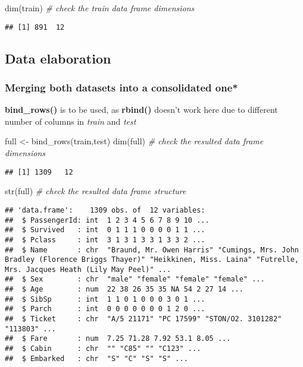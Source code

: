 \documentclass[
]{article}
\newenvironment{Shaded}{\begin{snugshade}}{\end{snugshade}}
\newcommand{\CommentTok}[1]{\textcolor[rgb]{0.56,0.35,0.01}{\textit{#1}}}
\newcommand{\FunctionTok}[1]{\textcolor[rgb]{0.00,0.00,0.00}{#1}}
\newcommand{\NormalTok}[1]{#1}
\newcommand{\OtherTok}[1]{\textcolor[rgb]{0.56,0.35,0.01}{#1}}
\begin{document}
\begin{Shaded}
\begin{Highlighting}[]
\FunctionTok{dim}\NormalTok{(train)  }\CommentTok{\# check the train data frame dimensions}
\end{Highlighting}
\end{Shaded}

\begin{verbatim}
## [1] 891  12
\end{verbatim}

\hypertarget{data-elaboration}{%
\subsection{Data elaboration}\label{data-elaboration}}

\hypertarget{merging-both-datasets-into-a-consolidated-one}{%
\subsubsection{Merging both datasets into a consolidated
one*}\label{merging-both-datasets-into-a-consolidated-one}}

\textbf{bind\_rows()} is to be used, as \textbf{rbind()} doesn't work
here due to different number of columns in \emph{train} and \emph{test}

\begin{Shaded}
\begin{Highlighting}[]
\NormalTok{full }\OtherTok{\textless{}{-}} \FunctionTok{bind\_rows}\NormalTok{(train,test) }
\FunctionTok{dim}\NormalTok{(full)  }\CommentTok{\# check the resulted data frame dimensions}
\end{Highlighting}
\end{Shaded}

\begin{verbatim}
## [1] 1309   12
\end{verbatim}

\begin{Shaded}
\begin{Highlighting}[]
\FunctionTok{str}\NormalTok{(full)  }\CommentTok{\# check the resulted data frame structure}
\end{Highlighting}
\end{Shaded}

\begin{verbatim}
## 'data.frame':    1309 obs. of  12 variables:
##  $ PassengerId: int  1 2 3 4 5 6 7 8 9 10 ...
##  $ Survived   : int  0 1 1 1 0 0 0 0 1 1 ...
##  $ Pclass     : int  3 1 3 1 3 3 1 3 3 2 ...
##  $ Name       : chr  "Braund, Mr. Owen Harris" "Cumings, Mrs. John Bradley (Florence Briggs Thayer)" "Heikkinen, Miss. Laina" "Futrelle, Mrs. Jacques Heath (Lily May Peel)" ...
##  $ Sex        : chr  "male" "female" "female" "female" ...
##  $ Age        : num  22 38 26 35 35 NA 54 2 27 14 ...
##  $ SibSp      : int  1 1 0 1 0 0 0 3 0 1 ...
##  $ Parch      : int  0 0 0 0 0 0 0 1 2 0 ...
##  $ Ticket     : chr  "A/5 21171" "PC 17599" "STON/O2. 3101282" "113803" ...
##  $ Fare       : num  7.25 71.28 7.92 53.1 8.05 ...
##  $ Cabin      : chr  "" "C85" "" "C123" ...
##  $ Embarked   : chr  "S" "C" "S" "S" ...
\end{verbatim}
\end{document}
